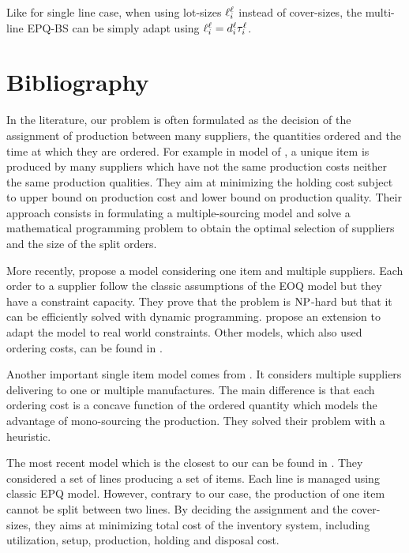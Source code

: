 Like for single line case, when using lot-sizes $\ell_i^{\ell}$ instead of cover-sizes, the multi-line EPQ-BS can be simply adapt using $\ell_i^{\ell}=d_i^{\ell}\tau_i^{\ell}$.



\section{Bibliography}



In the literature, our problem is often formulated as the decision of the assignment of production between many suppliers, the quantities ordered and the time at which they are ordered.
For example in model of \cite{Hong1992}, a unique item is produced by many suppliers which have not the same production costs neither the same production qualities.
They aim at minimizing the holding cost subject to upper bound on production cost and lower bound on production quality.
Their approach consists in formulating a multiple-sourcing model and solve a mathematical programming problem to obtain the optimal selection of suppliers and the size of the split orders.


More recently, \cite{Rosenblatt1998} propose a model considering one item and multiple suppliers.
Each order to a supplier follow the classic assumptions of the EOQ model but they have a constraint capacity.
They prove that the problem is $\operatorname{NP}$-hard but that it can be efficiently solved with dynamic programming.
\cite{Chang2006} propose an extension to adapt the model to real world constraints.
Other models, which also used ordering costs, can be found in \cite{Kim2005,Park2006}.


Another important single item model comes from \cite{Chauhan2003}.
It considers multiple suppliers delivering to one or multiple manufactures.
The main difference is that each ordering cost is a concave function of the ordered quantity which models the advantage of mono-sourcing the production.
They solved their problem with a heuristic.


The most recent model which is the closest to our can be found in \cite{Nobil2016}.
They considered a set of lines producing a set of items.
Each line is managed using classic EPQ model.
However, contrary to our case, the production of one item cannot be split between two lines.
By deciding the assignment and the cover-sizes, they aims at minimizing total cost of the inventory system, including utilization, setup, production, holding and disposal cost.




